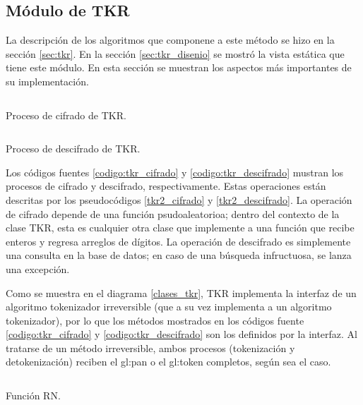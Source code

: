%
%
%

\subsection{Módulo de TKR}

La descripción de los algoritmos que componene a este método se hizo en la
sección \ref{sec:tkr}. En la sección \ref{sec:tkr_disenio} se mostró la vista
estática que tiene este módulo. En esta sección se muestran los aspectos más
importantes de su implementación.

\begin{listing}
  \inputminted[firstline=41, lastline=69]
    {c++}{../implementaciones/tkr/tkr.cpp}
  \caption{Proceso de cifrado de TKR.}
  \label{codigo:tkr_cifrado}
\end{listing}

\begin{listing}
  \inputminted[firstline=71, lastline=86]
    {c++}{../implementaciones/tkr/tkr.cpp}
  \caption{Proceso de descifrado de TKR.}
  \label{codigo:tkr_descifrado}
\end{listing}

Los códigos fuentes \ref{codigo:tkr_cifrado} y \ref{codigo:tkr_descifrado}
mustran los procesos de cifrado y descifrado, respectivamente. Estas operaciones
están descritas por los pseudocódigos \ref{tkr2_cifrado} y
\ref{tkr2_descifrado}. La operación de cifrado depende de una función
psudoaleatorioa; dentro del contexto de la clase TKR, esta es cualquier
otra clase que implemente a una función que recibe enteros y regresa
arreglos de dígitos. La operación de descifrado es simplemente una consulta
en la base de datos; en caso de una búsqueda infructuosa, se lanza una
excepción.

Como se muestra en el diagrama \ref{clases_tkr}, TKR implementa la interfaz
de un algoritmo tokenizador irreversible (que a su vez implementa a un
algoritmo tokenizador), por lo que los métodos mostrados en los códigos
fuente \ref{codigo:tkr_cifrado} y \ref{codigo:tkr_descifrado} son
los definidos por la interfaz. Al tratarse de un método irreversible,
ambos procesos (tokenización y detokenización) reciben el \gls{gl:pan} o el
\gls{gl:token} completos, según sea el caso.

\begin{listing}
  \inputminted[firstline=53, lastline=75]
    {c++}{../implementaciones/tkr/funcion_rn.cpp}
  \caption{Función RN.}
  \label{codigo:funcion_rn}
\end{listing}

